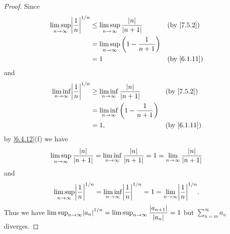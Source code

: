 \begin{proof}
  Since
  \begin{align*}
    \limsup_{n \to \infty} \abs{\dfrac{1}{n}}^{1 / n} & \leq \limsup_{n \to \infty} \dfrac{\abs{n}}{\abs{n + 1}}  &  & \by{7.5.2}  \\
                                                      & = \limsup_{n \to \infty} \bigg(1 - \dfrac{1}{n + 1}\bigg)                  \\
                                                      & = 1                                                       &  & \by{6.1.11}
  \end{align*}
  and
  \begin{align*}
    \liminf_{n \to \infty} \abs{\dfrac{1}{n}}^{1 / n} & \geq \liminf_{n \to \infty} \dfrac{\abs{n}}{\abs{n + 1}}  &  & \by{7.5.2}  \\
                                                      & = \liminf_{n \to \infty} \bigg(1 - \dfrac{1}{n + 1}\bigg)                  \\
                                                      & = 1,                                                      &  & \by{6.1.11}
  \end{align*}
  by \cref{6.4.12}(f) we have
  \[
    \limsup_{n \to \infty} \dfrac{\left\lvert n\right\rvert}{\left\lvert n + 1\right\rvert} = \liminf_{n \to \infty} \dfrac{\left\lvert n\right\rvert}{\left\lvert n + 1\right\rvert} = 1 = \lim_{n \to \infty} \dfrac{\left\lvert n\right\rvert}{\left\lvert n + 1\right\rvert}
  \]
  and
  \[
    \limsup_{n \to \infty} \abs{\dfrac{1}{n}}^{1 / n} = \liminf_{n \to \infty} \abs{\dfrac{1}{n}}^{1 / n} = 1 = \lim_{n \to \infty} \abs{\dfrac{1}{n}}^{1 / n}.
  \]
  Thus we have \(\limsup_{n \to \infty} \abs{a_n}^{1 / n} = \limsup_{n \to \infty} \dfrac{\abs{a_{n + 1}}}{\abs{a_n}} = 1\) but \(\sum_{n = m}^\infty a_n\) diverges.


\end{proof}
